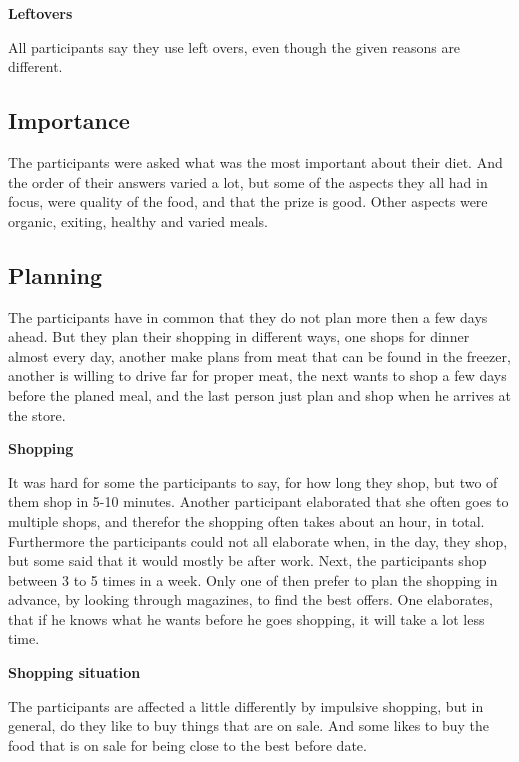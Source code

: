 \textbf{Leftovers}

All participants say they use left overs, even though the given reasons are different.
\subsection{Importance}
The participants were asked what was the most important about their diet. And the order of their answers varied a lot, but some of the aspects they all had in focus, were quality of the food, and that the prize is good. Other aspects were organic, exiting, healthy and varied meals.
\subsection{Planning}
The participants have in common that they do not plan more then a few days ahead. But they plan their shopping in different ways, one shops for dinner almost every day, another make plans from meat that can be found in the freezer, another is willing to drive far for proper meat, the next wants to shop a few days before the planed meal, and the last person just plan and shop when he arrives at the store.

\textbf{Shopping}

It was hard for some the participants to say, for how long they shop, but two of them shop in 5-10 minutes. Another participant elaborated that she often goes to multiple shops, and therefor the shopping often takes about an hour, in total. Furthermore the participants could not all elaborate when, in the day, they shop, but some said that it would mostly be after work. Next, the participants shop between 3 to 5 times in a week. Only one of then prefer to plan the shopping in advance, by looking through magazines, to find the best offers. One elaborates, that if he knows what he wants before he goes shopping, it will take a lot less time.

\textbf{Shopping situation}

The participants are affected a little differently by impulsive shopping, but in general, do they like to buy things that are on sale. And some likes to buy the food that is on sale for being close to the best before date.